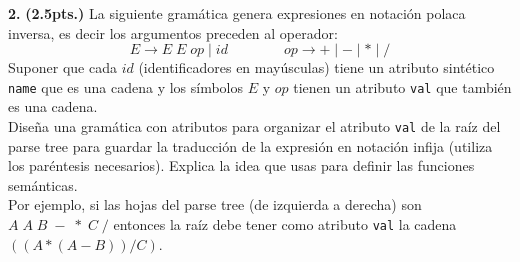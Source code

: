 \textbf{2.} \textbf{(2.5pts.)} La siguiente gram\'atica genera expresiones en 
notaci\'on polaca inversa, es decir los argumentos preceden al operador:
\[
 E \to E\; E\; op \mid id \qquad \qquad op \to + \mid - \mid * \mid /
\]
Suponer que cada $id$ (identificadores en may\'usculas) tiene un atributo 
sint\'etico \texttt{name} que es una cadena y los s\'imbolos $E$ y $op$ tienen 
un atributo \texttt{val} que tambi\'en es una cadena.\\
Dise\~na una gram\'atica con atributos para organizar el atributo \texttt{val} 
de la ra\'iz del parse tree para guardar la traducci\'on de la expresi\'on en 
notaci\'on infija (utiliza los par\'entesis necesarios). 
Explica la idea que usas para definir las funciones sem\'anticas.\\
Por ejemplo, si las hojas del parse tree (de izquierda a derecha) son 
$A\; A\; B \; - \;* \; C \;/$ entonces la ra\'iz debe tener como atributo 
\texttt{val} la cadena $((A*(A-B))/C)$.
